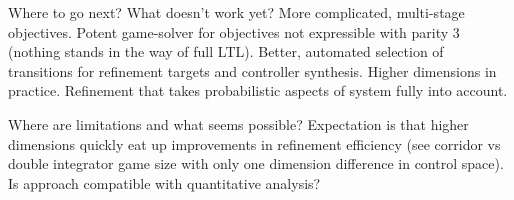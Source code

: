 Where to go next?  What doesn't work yet?
More complicated, multi-stage objectives.
Potent game-solver for objectives not expressible with parity 3 (nothing stands in the way of full LTL).
Better, automated selection of transitions for refinement targets and controller synthesis.
Higher dimensions in practice.
Refinement that takes probabilistic aspects of system fully into account.

Where are limitations and what seems possible?
Expectation is that higher dimensions quickly eat up improvements in refinement efficiency (see corridor vs double integrator game size with only one dimension difference in control space).
Is approach compatible with quantitative analysis?

